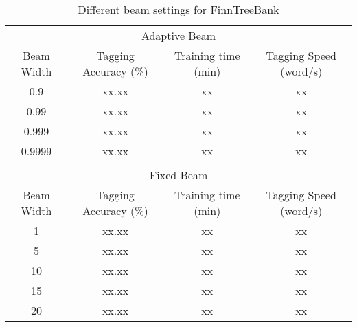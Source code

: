 \begin{table}[htb!]
\begin{center}
\begin{tabular}{cccc}
\multicolumn{4}{c}{Adaptive Beam}\\
Beam Width & Tagging Accuracy (\%) & Training time (min) & Tagging Speed (word/s)\\
\hline
0.9        & xx.xx            & xx            & xx            \\
0.99       & xx.xx            & xx            & xx            \\
0.999      & xx.xx            & xx            & xx            \\
0.9999     & xx.xx            & xx            & xx            \\
\hline
           &                  &               &               \\
\multicolumn{4}{c}{Fixed Beam}\\
Beam Width & Tagging Accuracy (\%) & Training time (min) & Tagging Speed (word/s) \\
\hline
1        & xx.xx            & xx            & xx            \\
5        & xx.xx            & xx            & xx            \\
10       & xx.xx            & xx            & xx            \\
15       & xx.xx            & xx            & xx            \\
20       & xx.xx            & xx            & xx            \\
\end{tabular}
\caption{Different beam settings for FinnTreeBank}
\end{center}
\end{table}

